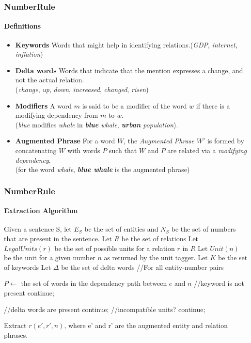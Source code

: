 \documentclass{beamer}
\newcommand{\ntronitemsep}{1em}
\begin{document}
\begin{frame}
\frametitle{NumberRule}
\framesubtitle{Definitions}
\begin{itemize}
\setlength\itemsep{\ntronitemsep}

 \item \textbf{Keywords}  Words that might help in identifying relations.(\textit{GDP}, \textit{internet}, \textit{inflation})
 \item \textbf{Delta words} Words that indicate that the mention expresses a change, and not the actual relation. \\ (\textit{change}, \textit{up}, \textit{down}, \textit{increased}, \textit{changed}, \textit{risen})
  \item \textbf{Modifiers} A word $m$ is said to be a modifier of the word $w$ if there is a modifying dependency from $m$ to $w$.\\ (\textit{blue} modifies \textit{whale} in \emph{\textbf{blue} whale}, \emph{\textbf{urban} population}).
  \item \textbf{Augmented Phrase} For a word $W$, the \emph{Augmented Phrase} $W'$ is formed by concatenating $W$ with words $P$ such that $W$ and $P$ are related via a \emph{modifying dependency}. \\(for the word \textit{whale}, \textbf{\textit{blue whale}} is the augmented phrase)
\end{itemize}

\end{frame}


\begin{frame}[allowframebreaks]
\frametitle{NumberRule}
\framesubtitle{Extraction Algorithm}
\begin{algorithmic}[1]
\State Given a sentence S, let $E_S$ be the set of entities and $N_S$ be the set of numbers that are present in the sentence.
\State Let $R$ be the set of relations
\State Let $LegalUnits(r)$ be the set of possible units for a relation $r$ in $R$ 
\State Let $Unit(n)$ be the unit for a given number $n$ as returned by the unit tagger. 
\State Let $K$ be the set of keywords 
\State Let $\Delta$ be the set of delta words
 //For all entity-number pairs

\State $P \gets$ the set of words in the dependency path between $e$ and $n$
 //keyword is not present
\State continue;
\EndIf
\item[]
 //delta words are present
\State continue;
\EndIf
{} //incompatible units?
\State continue;
\EndIf

\State Extract $r(e', r', n)$, where e' and r' are the augmented entity and relation phrases.
\EndFor
\EndFor
\end{algorithmic}
\end{frame}
\end{document}
